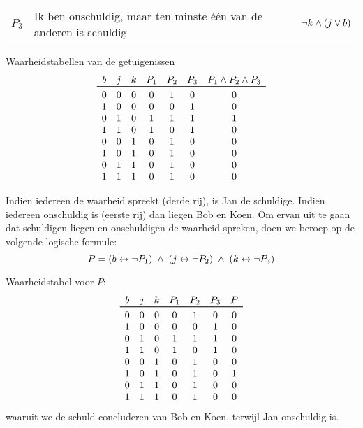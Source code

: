 \begin{oef}
\begin{opl}
\begin{samepage}
\begin{center}
\begin{tabular}{rp{8cm}l}
    $P_3$ & \raggedright Ik ben onschuldig, maar ten minste \'{e}\'{e}n van de anderen is schuldig & $\neg k \wedge (j \vee b)$ \\
  \end{tabular}
\end{center}
\end{samepage}
\begin{samepage}
Waarheidstabellen van de getuigenissen
\[
  \begin{array}{cccccccc}
    b & j & k & P_1 & P_2 & P_3 & P_1 \en P_2 \en P_3 \\
    \toprule
    0 & 0 & 0 & 0 & 1 & 0 & 0 \\
    1 & 0 & 0 & 0 & 0 & 1 & 0 \\
    0 & 1 & 0 & 1 & 1 & 1 & 1 \\
    1 & 1 & 0 & 1 & 0 & 1 & 0 \\
    0 & 0 & 1 & 0 & 1 & 0 & 0 \\
    1 & 0 & 1 & 0 & 1 & 0 & 0 \\
    0 & 1 & 1 & 0 & 1 & 0 & 0 \\
    1 & 1 & 1 & 0 & 1 & 0 & 0 \\
  \end{array}
\]
\end{samepage}
\begin{samepage}
Indien iedereen de waarheid spreekt (derde rij), is Jan de schuldige.
Indien iedereen onschuldig is (eerste rij) dan liegen Bob en Koen.
Om ervan uit te gaan dat schuldigen liegen en onschuldigen de waarheid spreken,
doen we beroep op de volgende logische formule:
\[
  P = (b \leftrightarrow \neg P_1) \;\wedge\; (j \leftrightarrow \neg P_2) \;\wedge\; (k \leftrightarrow \neg P_3)
\]
\end{samepage}
\begin{samepage}
Waarheidstabel voor $P$:
\[
  \begin{array}{cccccccc}
    b & j & k & P_1 & P_2 & P_3 & P \\
    \toprule
    0 & 0 & 0 & 0 & 1 & 0 & 0 \\
    1 & 0 & 0 & 0 & 0 & 1 & 0 \\
    0 & 1 & 0 & 1 & 1 & 1 & 0 \\
    1 & 1 & 0 & 1 & 0 & 1 & 0 \\
    0 & 0 & 1 & 0 & 1 & 0 & 0 \\
    1 & 0 & 1 & 0 & 1 & 0 & 1 \\
    0 & 1 & 1 & 0 & 1 & 0 & 0 \\
    1 & 1 & 1 & 0 & 1 & 0 & 0 \\
  \end{array}
\]
waaruit we de schuld concluderen van Bob en Koen, terwijl Jan onschuldig is.
\end{samepage}
\end{opl}
\end{oef}

